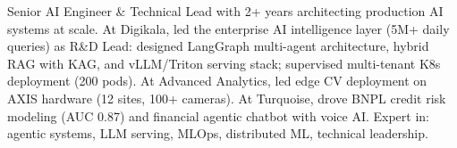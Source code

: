 \small{Senior AI Engineer \& Technical Lead with 2+ years architecting production AI systems at scale. At Digikala, led the enterprise AI intelligence layer (5M+ daily queries) as R\&D Lead: designed LangGraph multi-agent architecture, hybrid RAG with KAG, and vLLM/Triton serving stack; supervised multi-tenant K8s deployment (200 pods). At Advanced Analytics, led edge CV deployment on AXIS hardware (12 sites, 100+ cameras). At Turquoise, drove BNPL credit risk modeling (AUC 0.87) and financial agentic chatbot with voice AI. Expert in: agentic systems, LLM serving, MLOps, distributed ML, technical leadership.}\vspace{3pt}